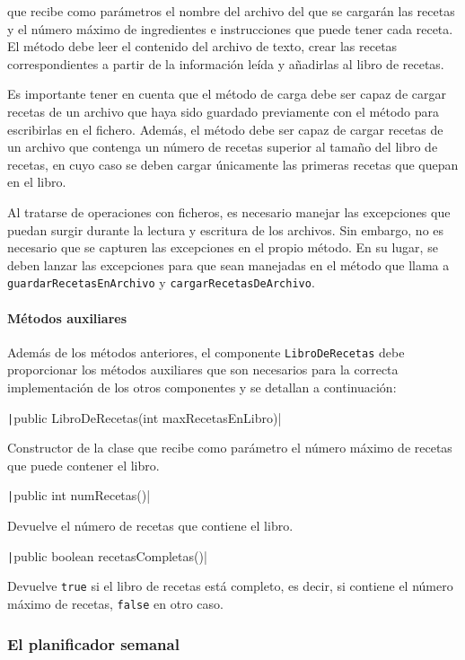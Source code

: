 \documentclass[
    a4paper, %
    12pt, %
]{CSSullivanBusinessReport}
\begin{document}
que recibe como parámetros el nombre del archivo del que se cargarán las recetas y el número máximo de ingredientes e instrucciones que puede tener cada receta. El método debe leer el contenido del archivo de texto, crear las recetas correspondientes a partir de la información leída y añadirlas al libro de recetas.

Es importante tener en cuenta que el método de carga debe ser capaz de cargar recetas de un archivo que haya sido guardado previamente con el método para escribirlas en el fichero. Además, el método debe ser capaz de cargar recetas de un archivo que contenga un número de recetas superior al tamaño del libro de recetas, en cuyo caso se deben cargar únicamente las primeras recetas que quepan en el libro.

Al tratarse de operaciones con ficheros, es necesario manejar las excepciones que puedan surgir durante la lectura y escritura de los archivos. Sin embargo, no es necesario que se capturen las excepciones en el propio método. En su lugar, se deben lanzar las excepciones para que sean manejadas en el método que llama a \texttt{guardarRecetasEnArchivo} y \texttt{cargarRecetasDeArchivo}.

\paragraph{Métodos auxiliares}

Además de los métodos anteriores, el componente \texttt{LibroDeRecetas} debe proporcionar los métodos auxiliares que son necesarios para la correcta implementación de los otros componentes y se detallan a continuación:

\texttt|public LibroDeRecetas(int maxRecetasEnLibro)|

Constructor de la clase que recibe como parámetro el número máximo de recetas que puede contener el libro.

\texttt|public int numRecetas()|

Devuelve el número de recetas que contiene el libro.

\texttt|public boolean recetasCompletas()|

Devuelve \texttt{true} si el libro de recetas está completo, es decir, si contiene el número máximo de recetas, \texttt{false} en otro caso.

\subsubsection{El planificador semanal}\label{sec:planificador-semanal}
\end{document}
